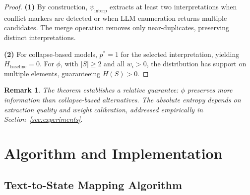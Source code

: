 \documentclass[11pt,a4paper]{article}
\newtheorem{remark}{Remark}
\begin{document}
\begin{proof}
\textbf{(1)} By construction, $\psi_{\text{interp}}$ extracts at least two 
interpretations when conflict markers are detected or when LLM enumeration 
returns multiple candidates. The merge operation removes only near-duplicates, 
preserving distinct interpretations.

\textbf{(2)} For collapse-based models, $p^* = 1$ for the selected interpretation, 
yielding $H_{\text{baseline}} = 0$. For $\phi$, with $|S| \geq 2$ and all $w_i > 0$, 
the distribution has support on multiple elements, guaranteeing $H(S) > 0$.
\end{proof}

\begin{remark}
The theorem establishes a \textit{relative} guarantee: $\phi$ preserves 
more information than collapse-based alternatives. The absolute entropy 
depends on extraction quality and weight calibration, addressed empirically 
in Section~\ref{sec:experiments}.
\end{remark}

\section{Algorithm and Implementation}
\label{sec:algorithm}

\subsection{Text-to-State Mapping Algorithm}
\end{document}
